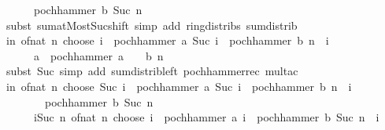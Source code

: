 \begin{isabellebody}
\ \ \ \ \ \ pochhammer\ b\ {\isacharparenleft}{\kern0pt}Suc\ n{\isacharparenright}{\kern0pt}{\isacharparenright}{\kern0pt}{\isachardoublequoteclose}\isanewline
\ \ \ \ \isamarkupfalse%
\ {\isacharparenleft}{\kern0pt}subst\ sum{\isachardot}{\kern0pt}atMost{\isacharunderscore}{\kern0pt}Suc{\isacharunderscore}{\kern0pt}shift{\isacharparenright}{\kern0pt}\ {\isacharparenleft}{\kern0pt}simp\ add{\isacharcolon}{\kern0pt}\ ring{\isacharunderscore}{\kern0pt}distribs\ sum{\isachardot}{\kern0pt}distrib{\isacharparenright}{\kern0pt}\isanewline
\ \ \isamarkupfalse%
\ \isamarkupfalse%
\ {\isachardoublequoteopen}{\isacharparenleft}{\kern0pt}{\isasymSum}i{\isasymle}n{\isachardot}{\kern0pt}\ of{\isacharunderscore}{\kern0pt}nat\ {\isacharparenleft}{\kern0pt}n\ choose\ i{\isacharparenright}{\kern0pt}\ {\isacharasterisk}{\kern0pt}\ pochhammer\ a\ {\isacharparenleft}{\kern0pt}Suc\ i{\isacharparenright}{\kern0pt}\ {\isacharasterisk}{\kern0pt}\ pochhammer\ b\ {\isacharparenleft}{\kern0pt}n\ {\isacharminus}{\kern0pt}\ i{\isacharparenright}{\kern0pt}{\isacharparenright}{\kern0pt}\ {\isacharequal}{\kern0pt}\isanewline
\ \ \ \ \ \ a\ {\isacharasterisk}{\kern0pt}\ pochhammer\ {\isacharparenleft}{\kern0pt}{\isacharparenleft}{\kern0pt}a\ {\isacharplus}{\kern0pt}\ {}{\isacharparenright}{\kern0pt}\ {\isacharplus}{\kern0pt}\ b{\isacharparenright}{\kern0pt}\ n{\isachardoublequoteclose}\isanewline
\ \ \ \ \isamarkupfalse%
\ {\isacharparenleft}{\kern0pt}subst\ Suc{\isacharparenright}{\kern0pt}\ {\isacharparenleft}{\kern0pt}simp\ add{\isacharcolon}{\kern0pt}\ sum{\isacharunderscore}{\kern0pt}distrib{\isacharunderscore}{\kern0pt}left\ pochhammer{\isacharunderscore}{\kern0pt}rec\ mult{\isacharunderscore}{\kern0pt}ac{\isacharparenright}{\kern0pt}\isanewline
\ \ \isamarkupfalse%
\ \isamarkupfalse%
\ {\isachardoublequoteopen}{\isacharparenleft}{\kern0pt}{\isasymSum}i{\isasymle}n{\isachardot}{\kern0pt}\ of{\isacharunderscore}{\kern0pt}nat\ {\isacharparenleft}{\kern0pt}n\ choose\ Suc\ i{\isacharparenright}{\kern0pt}\ {\isacharasterisk}{\kern0pt}\ pochhammer\ a\ {\isacharparenleft}{\kern0pt}Suc\ i{\isacharparenright}{\kern0pt}\ {\isacharasterisk}{\kern0pt}\ pochhammer\ b\ {\isacharparenleft}{\kern0pt}n\ {\isacharminus}{\kern0pt}\ i{\isacharparenright}{\kern0pt}{\isacharparenright}{\kern0pt}\ {\isacharplus}{\kern0pt}\isanewline
\ \ \ \ \ \ \ \ pochhammer\ b\ {\isacharparenleft}{\kern0pt}Suc\ n{\isacharparenright}{\kern0pt}\ {\isacharequal}{\kern0pt}\isanewline
\ \ \ \ \ \ {\isacharparenleft}{\kern0pt}{\isasymSum}i{\isacharequal}{\kern0pt}{}{\isachardot}{\kern0pt}{\isachardot}{\kern0pt}Suc\ n{\isachardot}{\kern0pt}\ of{\isacharunderscore}{\kern0pt}nat\ {\isacharparenleft}{\kern0pt}n\ choose\ i{\isacharparenright}{\kern0pt}\ {\isacharasterisk}{\kern0pt}\ pochhammer\ a\ i\ {\isacharasterisk}{\kern0pt}\ pochhammer\ b\ {\isacharparenleft}{\kern0pt}Suc\ n\ {\isacharminus}{\kern0pt}\ i{\isacharparenright}{\kern0pt}{\isacharparenright}{\kern0pt}{\isachardoublequoteclose}\isanewline

\end{isabellebody}
